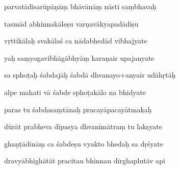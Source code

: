 \documentclass[article,12pt,a4paper]{memoir}%
\newcounter{parCount}
\begin{document}
	  
	  \pstart \leavevmode%
	parvatādisarūpāṇāṃ bhāvānāṃ nāsti saṃbhavaḥ 
	{}
	\pend%
      

	  
	  \pstart {} tasmād abhinnakāleṣu varṇavākyapadādiṣu 
	{}
	\pend%
      

	  
	  \pstart \leavevmode%
	vṛttikālaḥ svakālaś ca nādabhedād vibhajyate 
	{}
	\pend%
      

	  
	  \pstart {} yaḥ saṃyogavibhāgābhyāṃ karaṇair upajanyate 
	{}
	\pend%
      

	  
	  \pstart \leavevmode%
	sa sphoṭaḥ śabdajāḥ śabdā dhvanayo+anyair udāhṛtāḥ 
	{}
	\pend%
      

	  
	  \pstart {} alpe mahati vā śabde sphoṭakālo na bhidyate 
	{}
	\pend%
      

	  
	  \pstart \leavevmode%
	paras tu śabdasaṃtānaḥ pracayāpacayātmakaḥ 
	{}
	\pend%
      

	  
	  \pstart {} dūrāt prabheva dīpasya dhvanimātraṃ tu lakṣyate 
	{}
	\pend%
      

	  
	  \pstart \leavevmode%
	ghaṇṭādīnāṃ ca śabdeṣu vyakto bhedaḥ sa dṛśyate 
	{}
	\pend%
      

	  
	  \pstart {} dravyābhighātāt pracitau bhinnau dīrghaplutāv api 
	{}
	\pend%
      
\end{document}
